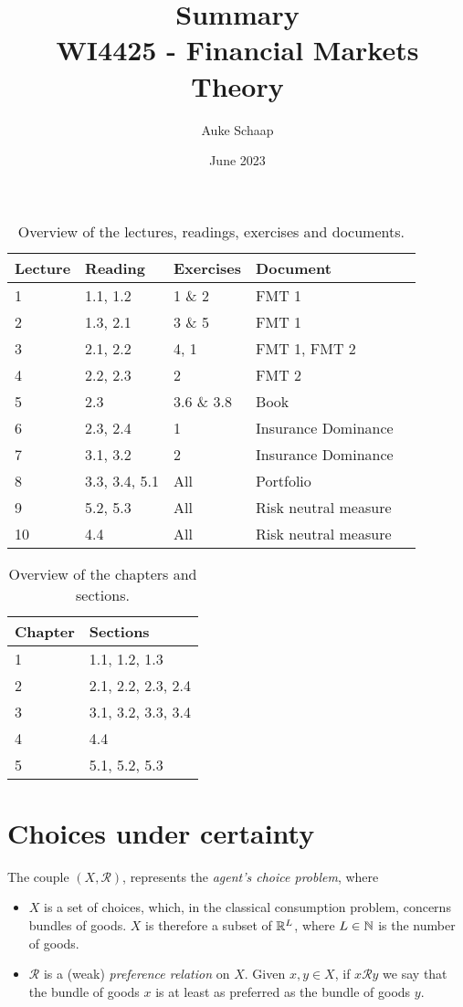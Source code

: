 \documentclass[twoside]{article}
\title{%
    Summary \\
    \large WI4425 - Financial Markets Theory
}
\author{Auke Schaap}
\date{June 2023}
\begin{document}
\maketitle
\newpage


\begin{table}[h]
    \centering
    \begin{tabular}{l|llll}
    Lecture &  Reading  &       Exercises & Document \\
    \hline
    1 &        1.1, 1.2 &       1 \& 2 & FMT 1 \\
    2 &        1.3, 2.1 &       3 \& 5 & FMT 1 \\
    3 &        2.1, 2.2 &       4, 1 & FMT 1, FMT 2 \\
    4 &        2.2, 2.3 &       2 & FMT 2 \\
    5 &        2.3 &            3.6 \& 3.8 & Book \\
    6 &        2.3, 2.4 &       1 & Insurance Dominance \\
    7 &        3.1, 3.2 &       2 & Insurance Dominance \\
    8 &        3.3, 3.4, 5.1 &  All & Portfolio \\
    9 &        5.2, 5.3 &       All & Risk neutral measure \\
    10&        4.4 &            All & Risk neutral measure
    \end{tabular}
    \caption{Overview of the lectures, readings, exercises and documents.}
\end{table}

\begin{table}[h]
    \centering
    \begin{tabular}{l|l}
    Chapter & Sections \\
    \hline
    1 & 1.1, 1.2, 1.3 \\
    2 & 2.1, 2.2, 2.3, 2.4 \\
    3 & 3.1, 3.2, 3.3, 3.4 \\
    4 & 4.4 \\
    5 & 5.1, 5.2, 5.3
    \end{tabular}
    \caption{Overview of the chapters and sections.}
\end{table}

\newpage

\section{Choices under certainty}

The couple $(X, \mathcal{R})$, represents the \textit{agent's choice problem}, where
\begin{itemize}
    \item $X$ is a set of choices, which, in the classical consumption problem, concerns bundles of goods. $X$ is therefore a subset of $\mathbb{R}^L$, where $L \in \mathbb{N}$ is the number of goods.
    \item $\mathcal{R}$ is a (weak) \textit{preference relation} on $X$. Given $x,y \in X$, if $x \mathcal{R} y$ we say that the bundle of goods $x$ is at least as preferred as the bundle of goods $y$.
\end{itemize}
\end{document}
